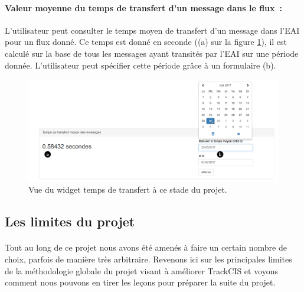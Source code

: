 			\paragraph{Valeur moyenne du temps de transfert d'un message dans le flux~: }
			L'utilisateur peut consulter le temps moyen de transfert d'un message dans
			l'EAI pour un flux donné. Ce temps est donné en seconde ((a) sur la figure
			\ref{vue_transfer}), il est calculé sur la base de tous les messages ayant
			transités par l'EAI sur une période donnée. L'utilisateur peut spécifier
			cette période grâce à un formulaire (b).
			\begin{figure}[H]
				\centering
				\includegraphics[width=12cm]{../img/part3/vue_transfer.png}
				\caption{\label{vue_transfer} Vue du widget temps de transfert à ce stade
				du projet.}
			\end{figure}
		
		\subsection{Les limites du projet}
			\paragraph{}%
			Tout au long de ce projet nous avons été amenés à faire un certain nombre de
			choix, parfois de manière très arbitraire. Revenons ici sur les principales
			limites de la méthodologie globale du projet visant à améliorer TrackCIS et
			voyons comment nous pouvons en tirer les leçons pour préparer la suite du
			projet.
		
